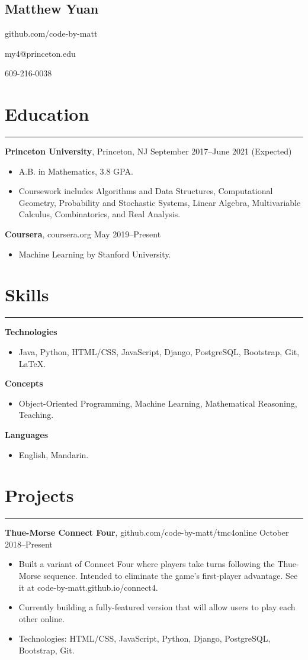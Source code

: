 \documentclass[11pt]{article}
\newcommand{\name}[1]{\begin{center}\section*{\huge #1}\end{center}}
\newcommand{\topinfo}[1]{\begin{center}\vspace{-0.2cm}#1\vspace{-0.2cm}\end{center}}
\newcommand{\resumesection}[1]{\vspace{-0.2cm}\section*{#1}\vspace{-0.2cm}\hrule\vspace{0.2cm}}
\begin{document}
\name{Matthew Yuan}
\topinfo{github.com/code-by-matt}
\topinfo{my4@princeton.edu}
\topinfo{609-216-0038}

\resumesection{Education}

\textbf{Princeton University}, Princeton, NJ \hfill September 2017--June 2021 (Expected)
\begin{itemize}
	\item A.B. in Mathematics, 3.8 GPA.
	\item Coursework includes Algorithms and Data Structures, Computational Geometry, Probability and Stochastic Systems, Linear Algebra, Multivariable Calculus, Combinatorics, and Real Analysis.
\end{itemize}

\textbf{Coursera}, coursera.org \hfill May 2019--Present
\begin{itemize}
	\item Machine Learning by Stanford University.
\end{itemize}

\resumesection{Skills}

\textbf{Technologies}
\begin{itemize}
	\item Java, Python, HTML/CSS, JavaScript, Django, PostgreSQL, Bootstrap, Git, \LaTeX.
\end{itemize}

\textbf{Concepts}
\begin{itemize}
	\item Object-Oriented Programming, Machine Learning, Mathematical Reasoning, Teaching.
\end{itemize}

\textbf{Languages}
\begin{itemize}
	\item English, Mandarin.
\end{itemize}

\resumesection{Projects}

\textbf{Thue-Morse Connect Four}, github.com/code-by-matt/tmc4online  \hfill October 2018--Present
\begin{itemize}
	\item Built a variant of Connect Four where players take turns following the Thue-Morse sequence. Intended to eliminate the game's first-player advantage. See it at code-by-matt.github.io/connect4.
	\item Currently building a fully-featured version that will allow users to play each other online.
	\item Technologies: HTML/CSS, JavaScript, Python, Django, PostgreSQL, Bootstrap, Git.
\end{itemize}
\end{document}

